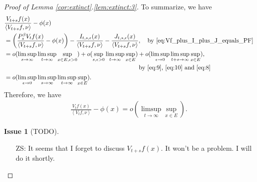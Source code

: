 \documentclass[12pt,a4paper]{amsart}
\numberwithin{equation}{section}
\theoremstyle{plain}
\theoremstyle{definition}
\newtheorem{iss}{Issue}
\begin{document}
\begin{proof}[Proof of Lemma \ref{cor:extinct}.\eqref{lem:extinct:3}]
To summarize, we have
\begin{align}
& \frac{V_{t+s}f(x)}{\left\langle V_{t+s}f,\nu \right\rangle} - \phi(x) 
  \\&= \left(\frac{P_s^\beta V_t f (x)}{\left\langle V_{t+s} f,\nu \right\rangle} - \phi(x)\right) - \frac{I_{t,s,\epsilon}(x)}{\left\langle V_{t+s} f,\nu \right\rangle} -\frac{ J_{t,s,\epsilon}(x)}{\left\langle V_{t+s}f,\nu \right\rangle},\quad\text{by~\eqref{eq:Vf_plus_I_plus_J_equals_PF}}
  \\& \begin{multlined} = o(\limsup_{s\to \infty} \limsup_{t\to \infty} \sup_{x\in E, \epsilon > 0}) + o(\sup_{s,\epsilon>0} \limsup_{t\to \infty} \sup_{x\in E}) + o(\limsup_{\epsilon \to 0} \limsup_{t+s \to \infty} \sup_{x\in E}),
\\ \text{by~\eqref{eq:9}, \eqref{eq:10} and \eqref{eq:8}} \end{multlined}
\\& = o(\limsup_{\epsilon \to 0} \limsup_{s\to \infty}\limsup_{t\to \infty} \sup_{x\in E}). 
\end{align}
Therefore, we have
\begin{align}
\frac{V_{t} f(x)}{\left\langle V_t f,\nu \right\rangle} - \phi(x) 
= o(\limsup_{t\to \infty} \sup_{x\in E}).
\end{align}
\begin{iss}[TODO]~
  \begin{itemize}
  \item[ZS:]
It seems that I forget to discuss $V_{t+s}f(x)$.
It won't be a problem. I will do it shortly.
  \end{itemize}
\end{iss} 
\end{proof}
\end{document}
